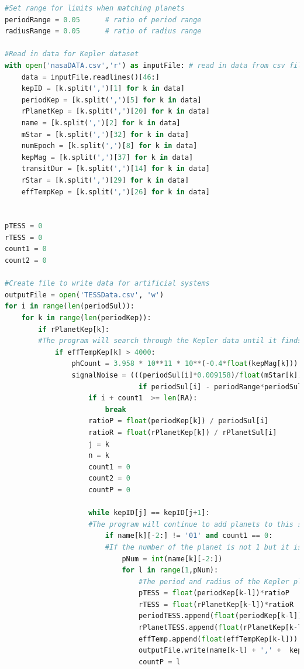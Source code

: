 \documentclass[12pt]{report}
\begin{document}
\begin{appendix}
\begin{lstlisting}[language=Python]
#Set range for limits when matching planets
periodRange = 0.05		# ratio of period range
radiusRange = 0.05		# ratio of radius range

#Read in data for Kepler dataset
with open('nasaDATA.csv','r') as inputFile: # read in data from csv file to respective arrays
	data = inputFile.readlines()[46:]
	kepID = [k.split(',')[1] for k in data]
	periodKep = [k.split(',')[5] for k in data]
	rPlanetKep = [k.split(',')[20] for k in data]
	name = [k.split(',')[2] for k in data]
	mStar = [k.split(',')[32] for k in data]
	numEpoch = [k.split(',')[8] for k in data]
	kepMag = [k.split(',')[37] for k in data]
	transitDur = [k.split(',')[14] for k in data]
	rStar = [k.split(',')[29] for k in data]
	effTempKep = [k.split(',')[26] for k in data]
	
	
pTESS = 0
rTESS = 0
count1 = 0
count2 = 0

#Create file to write data for artificial systems
outputFile = open('TESSData.csv', 'w')
for i in range(len(periodSul)): 		
	for k in range(len(periodKep)):
		if rPlanetKep[k]:
		#The program will search through the Kepler data until it finds a planet within the period and radius limits and in the correct effective temperature group.
			if effTempKep[k] > 4000:
				phCount = 3.958 * 10**11 * 10**(-0.4*float(kepMag[k]))
				signalNoise = (((periodSul[i]*0.009158)/float(mStar[k]))**2)/((1/math.sqrt(phCount)) * (1/math.sqrt(6)))		
								if periodSul[i] - periodRange*periodSul[i] <= float(periodKep[k]) <= periodSul[i] + periodRange*periodSul[i] and rPlanetSul[i] - radiusRange*rPlanetSul[i] <= float(rPlanetKep[k]) <= rPlanetSul[i] + radiusRange*rPlanetSul[i] and effTempSul[i] > 4000 :  #and signalNoise > SNRTH
					if i + count1  >= len(RA):
						break
					ratioP = float(periodKep[k]) / periodSul[i]	
					ratioR = float(rPlanetKep[k]) / rPlanetSul[i]
					j = k
					n = k
					count1 = 0
					count2 = 0
					countP = 0

					while kepID[j] == kepID[j+1]:
					#The program will continue to add planets to this system as long as the Kepler ID is the same as the next ID in the list.
						if name[k][-2:] != '01' and count1 == 0:
						#If the number of the planet is not 1 but it is the first planet in the system then the Sullivan data did not include the first planets. These are included here.
							pNum = int(name[k][-2:])
							for l in range(1,pNum):
								#The period and radius of the Kepler planets are multiplied with the ratio of period and radius to create the artificial systems.
								pTESS = float(periodKep[k-l])*ratioP
								rTESS = float(rPlanetKep[k-l])*ratioR
								periodTESS.append(float(periodKep[k-l])/ratioP)
								rPlanetTESS.append(float(rPlanetKep[k-l])/ratioR)
								effTemp.append(float(effTempKep[k-l]))
								outputFile.write(name[k-l] + ',' +  kepID[k-l] + ',' + str(pTESS) + ',' + str(rTESS) + ',' + mStar[k-l] + ',' + numEpoch[k-l] + ','  + transitDur[k-l] + ',' + rStar[k-l] + ',' + str(RA[i]) + ',' + str(dec[i]) + ',' + effTempKep[k] + ',' + str(effTempSul[i]) + ',' + str(ICMag[i]) + '\n')
								countP = l
								

\end{lstlisting}
\end{appendix}
\end{document}
